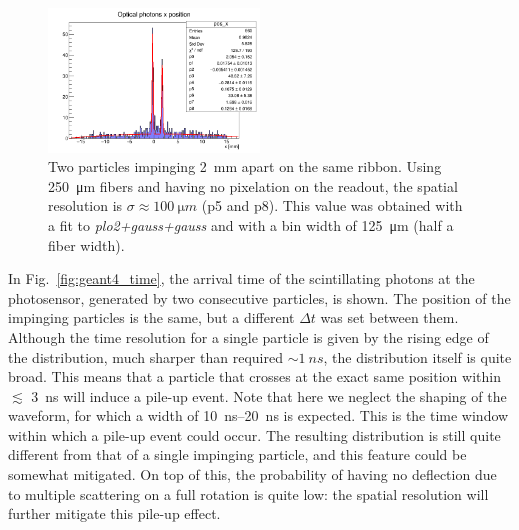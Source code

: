 \begin{refsection}
        \begin{figure}
            \centering
            \includegraphics[width=0.5\textwidth]{Figures/muEDM/Tracker/2mm.png}
            \caption{Two particles impinging \SI{2}{mm} apart on the same ribbon. Using \SI{250}{\micro m} fibers and having no pixelation on the readout, the spatial resolution is $\sigma\approx \SI{100}{\micro m}$ (p5 and p8). This value was obtained with a fit to \textit{plo2+gauss+gauss} and with a bin width of \SI{125}{\micro m} (half a fiber width).}
            \label{fig:geant4_position_resolution}
        \end{figure}
    
        In Fig.~\ref{fig:geant4_time}, the arrival time of the scintillating photons at the photosensor, generated by two consecutive particles, is shown. The position of the impinging particles is the same, but a different $\Delta t$ was set between them. Although the time resolution for a single particle is given by the rising edge of the distribution, much sharper than required $\sim \SI{1}{ns}$, the distribution itself is quite broad. This means that a particle that crosses at the exact same position within $\lesssim$ \SI{3}{ns} will induce a pile-up event. Note that here we neglect the shaping of the waveform, for which a width of \SIrange{10}{20}{ns} is expected. This is the time window within which a pile-up event could occur. The resulting distribution is still quite different from that of a single impinging particle, and this feature could be somewhat mitigated. On top of this, the probability of having no deflection due to multiple scattering on a full rotation is quite low: the spatial resolution will further mitigate this pile-up effect. 


\end{refsection}
